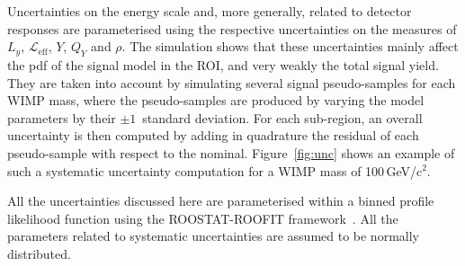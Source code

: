 Uncertainties on the energy scale and, more generally, related to detector responses  are parameterised 
using the respective uncertainties on the measures of $L_y$, $\mathcal{L}_{\text{eff}}$, $Y$, $Q_Y$ and $\rho$. The simulation shows 
that these uncertainties mainly affect the pdf of the signal model in the ROI, and very weakly the total signal yield. 
They are taken into account by simulating several signal pseudo-samples for each WIMP mass, where the pseudo-samples are produced 
by varying the model parameters by their $\pm 1$~standard deviation. 
For each sub-region, an overall uncertainty is then computed by adding in quadrature the residual of each pseudo-sample 
with respect to the nominal. Figure~\ref{fig:unc} shows an example of such a systematic uncertainty computation for a WIMP mass of 100\,GeV/c$^2$.


All the uncertainties discussed here are parameterised within a binned profile likelihood function using the ROOSTAT-ROOFIT framework~\cite{roostat,roofit}.
All the parameters related to systematic uncertainties are assumed to be normally distributed.



















